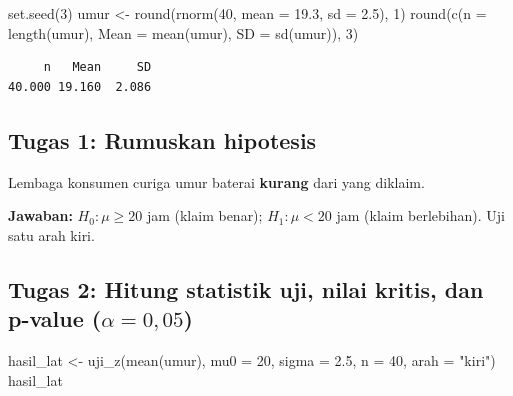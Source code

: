 \documentclass[
  indonesian,
  letterpaper,
]{book}
\newenvironment{Shaded}{\begin{snugshade}}{\end{snugshade}}
\newcommand{\AttributeTok}[1]{\textcolor[rgb]{0.40,0.45,0.13}{#1}}
\newcommand{\DecValTok}[1]{\textcolor[rgb]{0.68,0.00,0.00}{#1}}
\newcommand{\FloatTok}[1]{\textcolor[rgb]{0.68,0.00,0.00}{#1}}
\newcommand{\FunctionTok}[1]{\textcolor[rgb]{0.28,0.35,0.67}{#1}}
\newcommand{\NormalTok}[1]{\textcolor[rgb]{0.00,0.23,0.31}{#1}}
\newcommand{\OtherTok}[1]{\textcolor[rgb]{0.00,0.23,0.31}{#1}}
\newcommand{\StringTok}[1]{\textcolor[rgb]{0.13,0.47,0.30}{#1}}
\begin{document}
\begin{Shaded}
\begin{Highlighting}[]
\FunctionTok{set.seed}\NormalTok{(}\DecValTok{3}\NormalTok{)}
\NormalTok{umur }\OtherTok{\textless{}{-}} \FunctionTok{round}\NormalTok{(}\FunctionTok{rnorm}\NormalTok{(}\DecValTok{40}\NormalTok{, }\AttributeTok{mean =} \FloatTok{19.3}\NormalTok{, }\AttributeTok{sd =} \FloatTok{2.5}\NormalTok{), }\DecValTok{1}\NormalTok{)}
\FunctionTok{round}\NormalTok{(}\FunctionTok{c}\NormalTok{(}\AttributeTok{n =} \FunctionTok{length}\NormalTok{(umur), }\AttributeTok{Mean =} \FunctionTok{mean}\NormalTok{(umur), }\AttributeTok{SD =} \FunctionTok{sd}\NormalTok{(umur)), }\DecValTok{3}\NormalTok{)}
\end{Highlighting}
\end{Shaded}

\begin{verbatim}
     n   Mean     SD 
40.000 19.160  2.086 
\end{verbatim}

\subsection{Tugas 1: Rumuskan
hipotesis}\label{tugas-1-rumuskan-hipotesis}

Lembaga konsumen curiga umur baterai \textbf{kurang} dari yang diklaim.

\textbf{Jawaban:} \(H_0: \mu \ge 20\) jam (klaim benar);
\(H_1: \mu < 20\) jam (klaim berlebihan). Uji satu arah kiri.

\subsection{\texorpdfstring{Tugas 2: Hitung statistik uji, nilai kritis,
dan p-value
(\(\alpha = 0{,}05\))}{Tugas 2: Hitung statistik uji, nilai kritis, dan p-value (\textbackslash alpha = 0\{,\}05)}}\label{tugas-2-hitung-statistik-uji-nilai-kritis-dan-p-value-alpha-005}

\begin{Shaded}
\begin{Highlighting}[]
\NormalTok{hasil\_lat }\OtherTok{\textless{}{-}} \FunctionTok{uji\_z}\NormalTok{(}\FunctionTok{mean}\NormalTok{(umur), }\AttributeTok{mu0 =} \DecValTok{20}\NormalTok{, }\AttributeTok{sigma =} \FloatTok{2.5}\NormalTok{, }\AttributeTok{n =} \DecValTok{40}\NormalTok{, }\AttributeTok{arah =} \StringTok{"kiri"}\NormalTok{)}
\NormalTok{hasil\_lat}
\end{Highlighting}
\end{Shaded}
\end{document}
